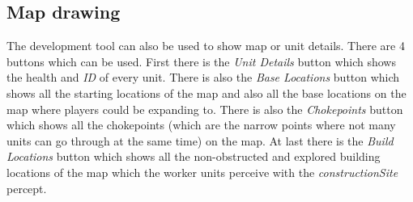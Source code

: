 \subsection{Map drawing}
The development tool can also be used to show map or unit details. There are 4 buttons which can be used. First there is the \textit{Unit Details} button which shows the health and \textit{ID} of every unit. There is also the \textit{Base Locations} button which shows all the starting locations of the map and also all the base locations on the map where players could be expanding to. There is also the \textit{Chokepoints} button which shows all the chokepoints (which are the narrow points where not many units can go through at the same time) on the map. At last there is the \textit{Build Locations} button which shows all the non-obstructed and explored building locations of the map which the worker units perceive with the \textit{constructionSite} percept. 

